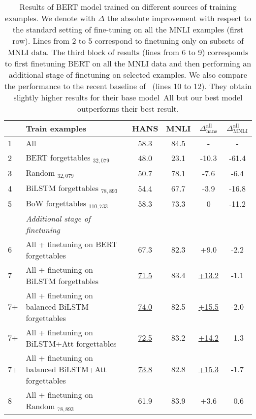 \begin{table*}[ht]
\caption{Results of BERT model trained on different sources of training examples. We denote with $\Delta$ the absolute improvement with respect to the standard setting of fine-tuning on all the MNLI examples (first row). Lines from 2 to 5 correspond to finetuning only on subsets of MNLI data. The third block of results (lines from 6 to 9) corresponds to first finetuning BERT on all the MNLI data and then performing an additional stage of finetuning on selected examples. We also compare the performance to the recent baseline of~\cite{clark2019dont} (lines 10 to 12). They obtain slightly higher results for their base model~\textrm{All} but our best model outperforms their best result.}
\small
\label{tab:twoclass}
\centering
\begin{tabular}{llcccc}
\toprule
& Train examples & HANS & MNLI & $\Delta^\textrm{all}_\textrm{hans}$ & $\Delta^\textrm{all}_\textrm{MNLI}$ \\
\midrule
\small{1} & All & 58.3 & 84.5 & - & -            \\
\midrule
\small{2} & BERT forgettables $_{32,079}$   & 48.0 & 23.1 & -10.3 & -61.4 \\
\small{3} & \hspace{0.1cm} Random $_{32,079}$ & 50.7 & 78.1 & -7.6 & -6.4 \\
\small{4} & BiLSTM forgettables $_{78,893}$ & 54.4 & 67.7 & -3.9  & -16.8 \\
\small{5} & BoW forgettables $_{110,733}$   & 58.3 & 73.3 & 0     & -11.2 \\
\midrule
&\emph{Additional stage of finetuning} \\
\small{6} & All + finetuning on BERT forgettables   & 67.3 & 82.3 & +9.0 & -2.2 \\
\small{7} & All + finetuning on BiLSTM forgettables & \underline{71.5} & 83.4 & \underline{+13.2} & -1.1 \\
\small{7+} & All + finetuning on balanced BiLSTM forgettables & \underline{74.0} & 82.5 & \underline{+15.5} & -2.0 \\
\small{7+} & All + finetuning on BiLSTM+Att forgettables & \underline{72.5} & 83.2 & \underline{+14.2} & -1.3 \\
\small{7+} & All + finetuning on balanced BiLSTM+Att forgettables & \underline{73.8} & 82.8 & \underline{+15.3} & -1.7 \\
\small{8} & \hspace{0.1cm} All + finetuning on Random $_{78,893}$       & 61.9 & 83.9 & +3.6 & -0.6 \\

\end{tabular}
\end{table*}
